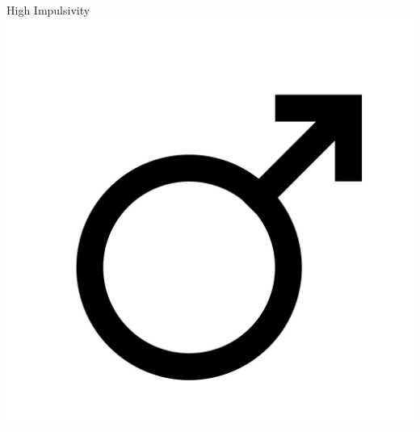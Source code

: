 \documentclass[aspectratio=169]{beamer}
\begin{document}
\begin{frame}
  \begin{center}
    \Huge High Impulsivity \\
    \includegraphics[scale=.025]{./assets/men.png} \\
    \small \cite{langford93}
  \end{center}
\end{frame}
\end{document}
